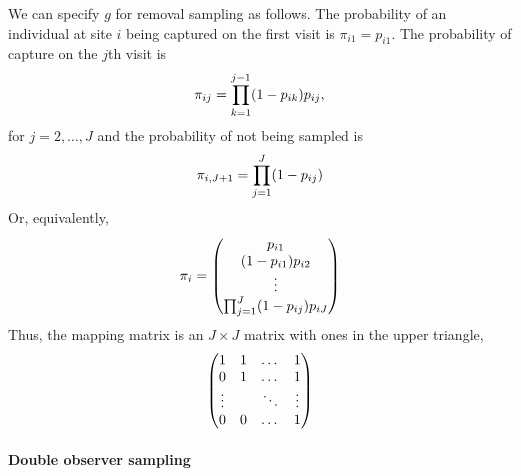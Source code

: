 \documentclass[article,shortnames]{jss}
\begin{document}
We can specify $g$ for removal sampling as follows.  The
probability of an individual at site $i$ being captured on the first
visit is $\pi_{i1} = p_{i1}$.  The probability of capture on the $j$th
visit is
\begin{equation}
  \pi_{ij} = \prod_{k=1}^{j-1}(1 - p_{ik})p_{ij}, \notag
\end{equation}
for $j=2,\dots,J$ and the probability of not being sampled is
\begin{equation}
  \pi_{i,J+1} = \prod_{j=1}^{J}(1-p_{ij}) \notag
\end{equation}
Or, equivalently,
\begin{equation}
  \mathbf \pi_i =
  \begin{pmatrix}
    p_{i1} \\
    (1-p_{i1})p_{i2} \\
    \vdots \\
    \prod_{j=1}^J(1-p_{ij})p_{iJ} \notag
  \end{pmatrix}
\end{equation}
Thus, the mapping matrix is an $J \times J$  matrix with ones in
the upper triangle,
\begin{equation}
  \begin{pmatrix}
    1 & 1 & \dots & 1 \\
    0 & 1 & \dots & 1 \\
    \vdots & & \ddots & \vdots \\
    0 & 0 & \dots  & 1 \notag
  \end{pmatrix}
\end{equation}


\paragraph{Double observer sampling}
\label{sec:double-observ-sampl}
\end{document}
